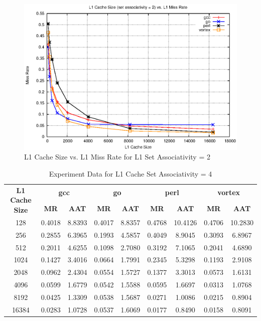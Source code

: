 \documentclass[a4paper]{article}
\begin{document}
\begin{figure}
    \centering
    \includegraphics[scale=1.32] {l1_sa_2.eps}
    \caption{L1 Cache Size vs. L1 Miss Rate for L1 Set Associativity = 2}
    \label{fig:l1mr_graph_sa2}
\end{figure}

\begin{table}[htbp]
    \centering
    \begin{tabular}{|c|c|c|c|c|c|c|c|c|}
        \hline
        \multirow{2}[4]{*}{\bf L1 Cache Size} & \multicolumn{2}{c|}{\bf gcc} & \multicolumn{2}{c|}{\bf go} & \multicolumn{2}{c|}{\bf perl}          &\multicolumn{2}{c|}{\bf vortex}\\
        \cline{2-9} & \bf MR & \bf AAT & \bf MR & \bf AAT & \bf MR & \bf AAT & \bf MR & \bf AAT \\
        \hline
        128 & 0.4018 & 8.8393 & 0.4017 & 8.8357 & 0.4768 & 10.4126 & 0.4706 & 10.2830 \\
        256 & 0.2855 & 6.3965 & 0.1993 & 4.5857 & 0.4049 & 8.9045 & 0.3093 & 6.8967 \\
        512 & 0.2011 & 4.6255 & 0.1098 & 2.7080 & 0.3192 & 7.1065 & 0.2041 & 4.6890 \\
        1024 & 0.1427 & 3.4016 & 0.0664 & 1.7991 & 0.2345 & 5.3298 & 0.1193 & 2.9108 \\
        2048 & 0.0962 & 2.4304 & 0.0554 & 1.5727 & 0.1377 & 3.3013 & 0.0573 & 1.6131 \\
        4096 & 0.0599 & 1.6779 & 0.0542 & 1.5588 & 0.0595 & 1.6697 & 0.0313 & 1.0768 \\
        8192 & 0.0425 & 1.3309 & 0.0538 & 1.5687 & 0.0271 & 1.0086 & 0.0215 & 0.8904 \\
        16384 & 0.0283 & 1.0728 & 0.0537 & 1.6069 & 0.0177 & 0.8490 & 0.0158 & 0.8091 \\
        \hline
    \end{tabular}
    \captionsetup{justification=centering}
    \caption{Experiment Data for L1 Cache Set Associativity = 4}
    \label{tab:l1mr_data_sa4}
\end{table}
\end{document}
